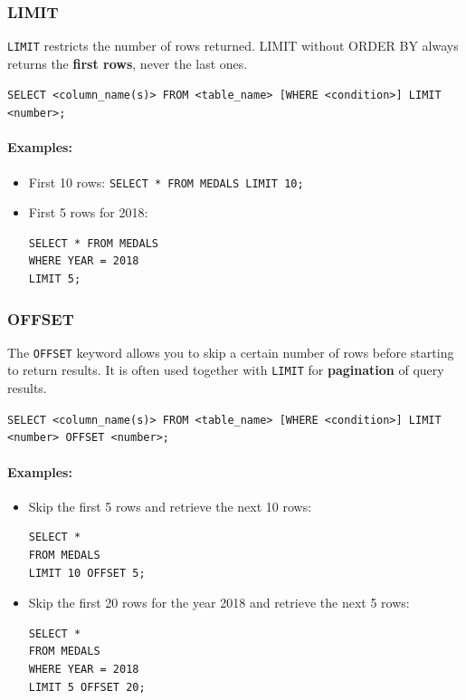 \documentclass{article}
\begin{document}
\subsubsection{LIMIT}
\texttt{LIMIT} restricts the number of rows returned. LIMIT without ORDER BY always returns the \textbf{first rows}, never the last ones. 

\begin{FormulaBox}
\texttt{SELECT <column\_name(s)> FROM <table\_name> [WHERE <condition>] LIMIT <number>;}
\end{FormulaBox}

\paragraph{Examples:}
\begin{itemize}
    \item First 10 rows: \texttt{SELECT * FROM MEDALS LIMIT 10;}
    \item First 5 rows for 2018: 
\begin{verbatim}
SELECT * FROM MEDALS 
WHERE YEAR = 2018 
LIMIT 5;
\end{verbatim}
\end{itemize}
\subsubsection{OFFSET}
The \texttt{OFFSET} keyword allows you to skip a certain number of rows before starting to return results.  
It is often used together with \texttt{LIMIT} for \textbf{pagination} of query results.

\begin{FormulaBox}
\texttt{SELECT <column\_name(s)> FROM <table\_name> [WHERE <condition>] 
LIMIT <number> OFFSET <number>;}
\end{FormulaBox}

\paragraph{Examples:}
\begin{itemize}
    \item Skip the first 5 rows and retrieve the next 10 rows: 
\begin{verbatim}
SELECT * 
FROM MEDALS 
LIMIT 10 OFFSET 5;
\end{verbatim}

    \item Skip the first 20 rows for the year 2018 and retrieve the next 5 rows:
\begin{verbatim}
SELECT * 
FROM MEDALS 
WHERE YEAR = 2018 
LIMIT 5 OFFSET 20;
\end{verbatim}
\end{itemize}
\end{document}
